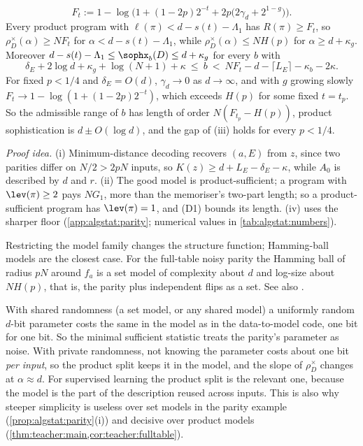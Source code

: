 \begin{proposition}
\begin{enumerate}[label=(\roman*)]
\[
F_t:=1-\log\Big(1+(1-2p)2^{-t}+2p\big(2\gamma_d+2^{1-g}\big)\Big).
\]
Every product program with $\ell(\pi)<d-s(t)-\Lambda_1$ has $R(\pi)\ge F_t$, so $\rho^\times_D(\alpha)\ge NF_t$ for $\alpha<d-s(t)-\Lambda_1$, while $\rho^\times_D(\alpha)\le NH(p)$ for $\alpha\ge d+\kappa_g$. Moreover $d-s(t)-\Lambda_1\le\sophx_b(D)\le d+\kappa_g$ for every $b$ with
\[
\delta_E+2\log d+\kappa_g+\log(N+1)+\kappa\ \le\ b\ <\ NF_t-d-\lceil L_E\rceil-\kappa_b-2\kappa.
\]
For fixed $p<1/4$ and $\delta_E=O(d)$, $\gamma_d\to0$ as $d\to\infty$, and with $g$ growing slowly $F_t\to1-\log(1+(1-2p)2^{-t})$, which exceeds $H(p)$ for some fixed $t=t_p$. So the admissible range of $b$ has length of order $N(F_{t_p}-H(p))$, product sophistication is $d\pm O(\log d)$, and the gap of (iii) holds for every $p<1/4$.
\end{enumerate}
\end{proposition}

\emph{Proof idea.} (i) Minimum-distance decoding recovers $(a,E)$ from $z$, since two parities differ on $N/2>2pN$ inputs, so $K(z)\ge d+L_E-\delta_E-\kappa$, while $A_0$ is described by $d$ and $r$. (ii) The good model is product-sufficient; a program with $\lev(\pi)\ge2$ pays $NG_1$, more than the memoriser's two-part length; so a product-sufficient program has $\lev(\pi)=1$, and (D1) bounds its length. (iv) uses the sharper floor (\cref{app:algstat:parity}; numerical values in \cref{tab:algstat:numbers}).

\begin{remark}\label{rem:algstat:restricted}
Restricting the model family changes the structure function; Hamming-ball models \citep{vereshchagin2010rate} are the closest case. For the full-table noisy parity the Hamming ball of radius $pN$ around $f_a$ is a set model of complexity about $d$ and log-size about $NH(p)$, that is, the parity plus independent flips as a set. See also \citet{milovanov2016algorithmic}.
\end{remark}

\begin{remark}\label{rem:algstat:reading}
With shared randomness (a set model, or any shared model) a uniformly random $d$-bit parameter costs the same in the model as in the data-to-model code, one bit for one bit. So the minimal sufficient statistic treats the parity's parameter as noise. With private randomness, not knowing the parameter costs about one bit \emph{per input}, so the product split keeps it in the model, and the slope of $\rho^\times_D$ changes at $\alpha\approx d$. For supervised learning the product split is the relevant one, because the model is the part of the description reused across inputs. This is also why steeper simplicity is useless over set models in the parity example (\cref{prop:algstat:parity}(i)) and decisive over product models (\cref{thm:teacher:main,cor:teacher:fulltable}).
\end{remark}
